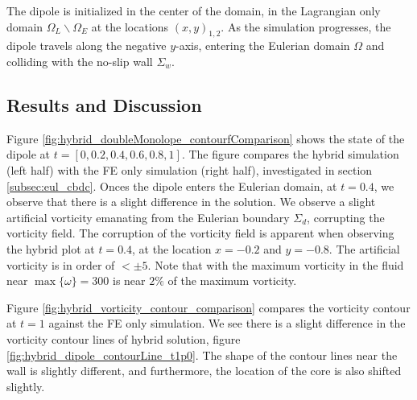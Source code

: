 The dipole is initialized in the center of the domain, in the Lagrangian only domain $\Omega_L\backslash\Omega_E$ at the locations $(x,y)_{1,2}$. As the simulation progresses, the dipole travels along the negative $y$-axis, entering the Eulerian domain $\Omega$ and colliding with the no-slip wall $\Sigma_{w}$.

\subsection{Results and Discussion}

Figure \ref{fig:hybrid_doubleMonolope_contourfComparison} shows the state of the dipole at $t=[0,0.2,0.4,0.6,0.8,1]$. The figure compares the hybrid simulation (left half) with the FE only simulation (right half), investigated in section \ref{subsec:eul_cbdc}. Onces the dipole enters the Eulerian domain, at $t=0.4$, we observe that there is a slight difference in the solution. We observe a slight artificial vorticity emanating from the Eulerian boundary $\Sigma_d$, corrupting the vorticity field. The corruption of the vorticity field is apparent when observing the hybrid plot at $t=0.4$, at the location $x=-0.2$ and $y=-0.8$. The artificial vorticity is in order of $<\pm5$. Note that with the maximum vorticity in the fluid near $\max\{\omega\}=300$ is near $2\%$ of the maximum vorticity.

Figure \ref{fig:hybrid_vorticity_contour_comparison} compares the vorticity contour at $t=1$ against the FE only simulation. We see there is a slight difference in the vorticity contour lines of hybrid solution, figure \ref{fig:hybrid_dipole_contourLine_t1p0}. The shape of the contour lines near the wall is slightly different, and furthermore, the location of the core is also shifted slightly.

